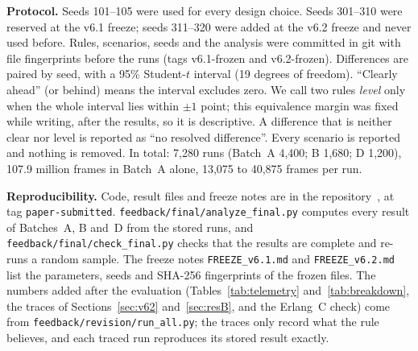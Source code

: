 \documentclass[conference]{IEEEtran}
\begin{document}
\textbf{Protocol.} Seeds 101--105 were used for every design choice. Seeds 301--310 were reserved at the v6.1 freeze; seeds 311--320 were added at the v6.2 freeze and never used before. Rules, scenarios, seeds and the analysis were committed in git with file fingerprints before the runs (tags v6.1-frozen and v6.2-frozen). Differences are paired by seed, with a 95\% Student-$t$ interval (19 degrees of freedom). ``Clearly ahead'' (or behind) means the interval excludes zero. We call two rules \emph{level} only when the whole interval lies within $\pm 1$ point; this equivalence margin was fixed while writing, after the results, so it is descriptive. A difference that is neither clear nor level is reported as ``no resolved difference''. Every scenario is reported and nothing is removed. In total: 7,280 runs (Batch~A 4,400; B 1,680; D 1,200), 107.9 million frames in Batch~A alone, 13,075 to 40,875 frames per run.

\textbf{Reproducibility.} Code, result files and freeze notes are in the repository~\cite{repo}, at tag \texttt{paper-submitted}. \texttt{feedback/final/analyze\_final.py} computes every result of Batches~A, B and~D from the stored runs, and \texttt{feedback/final/check\_final.py} checks that the results are complete and re-runs a random sample. The freeze notes \texttt{FREEZE\_v6.1.md} and \texttt{FREEZE\_v6.2.md} list the parameters, seeds and SHA-256 fingerprints of the frozen files. The numbers added after the evaluation (Tables~\ref{tab:telemetry} and~\ref{tab:breakdown}, the traces of Sections~\ref{sec:v62} and~\ref{sec:resB}, and the Erlang~C check) come from \texttt{feedback/revision/run\_all.py}; the traces only record what the rule believes, and each traced run reproduces its stored result exactly.

\end{document}
